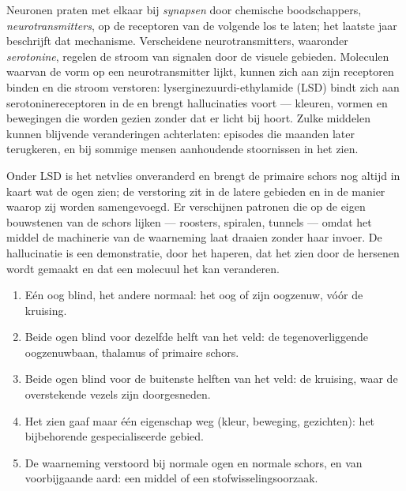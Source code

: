 \begin{proposition}\label{prop:g11:vision-and-brain:drugs}
Neuronen praten met elkaar bij \emph{synapsen} door chemische
boodschappers, \emph{neurotransmitters}, op de receptoren van de volgende
 los te laten; het laatste jaar beschrijft dat mechanisme. Verscheidene
neurotransmitters, waaronder \emph{serotonine}, regelen de stroom van
signalen door de visuele gebieden. Moleculen waarvan de vorm op een
neurotransmitter lijkt, kunnen zich aan zijn receptoren binden en die
stroom verstoren: lyserginezuurdi-ethylamide (LSD) bindt zich aan
serotoninereceptoren in de  en brengt hallucinaties voort
--- kleuren, vormen en bewegingen die worden gezien zonder dat er licht
bij hoort. Zulke middelen kunnen blijvende veranderingen achterlaten:
episodes die maanden later terugkeren, en bij sommige mensen aanhoudende
stoornissen in het zien.
\end{proposition}
\admitted

\begin{example}\label{ex:g11:vision-and-brain:hallucination}
Onder LSD is het netvlies onveranderd en brengt de primaire schors nog
altijd in kaart wat de ogen zien; de verstoring zit in de latere gebieden
en in de manier waarop zij worden samengevoegd. Er verschijnen patronen
die op de eigen bouwstenen van de schors lijken --- roosters, spiralen,
tunnels --- omdat het middel de machinerie van de waarneming laat draaien
zonder haar invoer. De hallucinatie is een demonstratie, door het
haperen, dat het zien door de hersenen wordt gemaakt en dat een molecuul
het kan veranderen.
\end{example}

\begin{method}\label{met:g11:vision-and-brain:locate}
\begin{enumerate}
  \item Eén oog blind, het andere normaal: het oog of zijn oogzenuw,
        vóór de kruising.
  \item Beide ogen blind voor dezelfde helft van het veld: de
        tegenoverliggende oogzenuwbaan, thalamus of primaire schors.
  \item Beide ogen blind voor de buitenste helften van het veld: de
        kruising, waar de overstekende vezels zijn doorgesneden.
  \item Het zien gaaf maar één eigenschap weg (kleur, beweging,
        gezichten): het bijbehorende gespecialiseerde gebied.
  \item De waarneming verstoord bij normale ogen en normale schors, en
        van voorbijgaande aard: een middel of een stofwisselingsoorzaak.
\end{enumerate}
\end{method}

